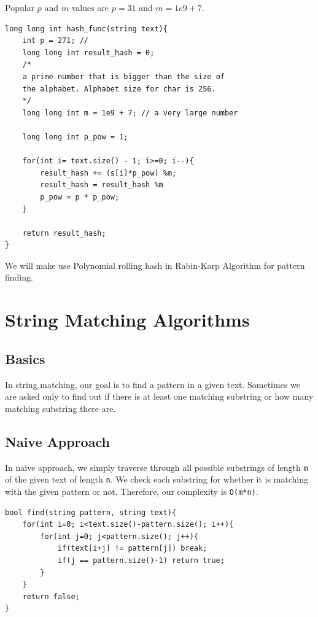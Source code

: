 \documentclass[12pt]{article}
\begin{document}
        Popular $p$ and $m$ values are $p = 31$ and $m = 1e9 + 7$.
    	
    	\begin{verbatim}
long long int hash_func(string text){
	int p = 271; // 
	long long int result_hash = 0;
	/*
	a prime number that is bigger than the size of 
	the alphabet. Alphabet size for char is 256.
	*/
	long long int m = 1e9 + 7; // a very large number
	
	long long int p_pow = 1;
	
	for(int i= text.size() - 1; i>=0; i--){
		result_hash += (s[i]*p_pow) %m;
		result_hash = result_hash %m
		p_pow = p * p_pow;
	}

	return result_hash;
}
        \end{verbatim}
    	
    	 We will make use Polynomial rolling hash in Rabin-Karp Algorithm for pattern finding.
    	\newpage
    	\section{String Matching Algorithms}
    	
    	\subsection{Basics}
    	
        In string matching, our goal is to find a pattern in a given text. Sometimes we are asked only to find out if there is at least one matching substring or how many matching substring there are.
    	
    	\subsection{Naive Approach}
    	In naive approach, we simply traverse through all possible substrings of length \texttt{m} of the given text of length \texttt{n}. We check each substring for whether it is matching with the given pattern or not. Therefore, our complexity is \texttt{O(m*n)}.
    	
    	\begin{verbatim}
bool find(string pattern, string text){
    for(int i=0; i<text.size()-pattern.size(); i++){
        for(int j=0; j<pattern.size(); j++){
            if(text[i+j] != pattern[j]) break;
            if(j == pattern.size()-1) return true;
        }
    }
    return false;
}
        \end{verbatim}
        
\end{document}
